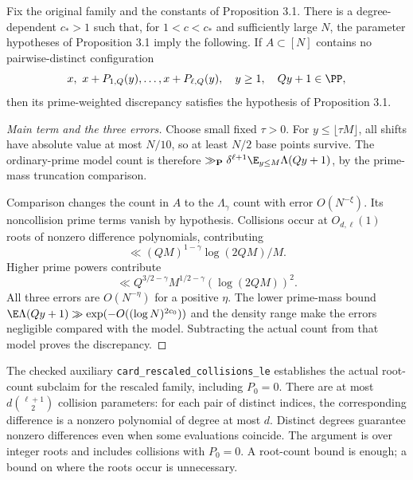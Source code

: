 \begin{lemma}\label{l:PS-discrepancy}
Fix the original family and the constants of Proposition 3.1. There is a degree-dependent $c_*>1$ such that, for $1<c<c_*$ and sufficiently large $N$, the parameter hypotheses of Proposition 3.1 imply the following. If $A\subset[N]$ contains no pairwise-distinct configuration
\[
 x,\ x+P_{1,Q}(y),\ldots,x+P_{\ell,Q}(y),
 \quad y\geq1,\quad Qy+1\in\PP,
\]
then its prime-weighted discrepancy satisfies the hypothesis of Proposition 3.1.
\end{lemma}
\begin{proof}[Main term and the three errors]
Choose small fixed $\tau>0$. For $y\leq\lfloor\tau M\rfloor$, all shifts have absolute value at most $N/10$, so at least $N/2$ base points survive. The ordinary-prime model count is therefore $\gg_{\mathbf P}\delta^{\ell+1}\E_{y\leq M}\Lambda(Qy+1)$, by the prime-mass truncation comparison.

Comparison changes the count in $A$ to the $\Lambda_\gamma$ count with error $O(N^{-\xi})$. Its noncollision prime terms vanish by hypothesis. Collisions occur at $O_{d,\ell}(1)$ roots of nonzero difference polynomials, contributing
\[
 \ll (QM)^{1-\gamma}\log(2QM)/M.
\]
Higher prime powers contribute
\[
 \ll Q^{3/2-\gamma}M^{1/2-\gamma}(\log(2QM))^2.
\]
All three errors are $O(N^{-\eta})$ for a positive $\eta$. The lower prime-mass bound $\E\Lambda(Qy+1)\gg\exp(-O((\log N)^{2c_0}))$ and the density range make the errors negligible compared with the model. Subtracting the actual count from that model proves the discrepancy.
\end{proof}
\ifDetailed
The checked auxiliary \texttt{card\_\allowbreak{}rescaled\_\allowbreak{}collisions\_\allowbreak{}le} establishes the actual root-count subclaim for the rescaled family, including $P_0=0$. There are at most $d\binom{\ell+1}{2}$ collision parameters: for each pair of distinct indices, the corresponding difference is a nonzero polynomial of degree at most $d$. Distinct degrees guarantee nonzero differences even when some evaluations coincide. The argument is over integer roots and includes collisions with $P_0=0$. A root-count bound is enough; a bound on where the roots occur is unnecessary.

